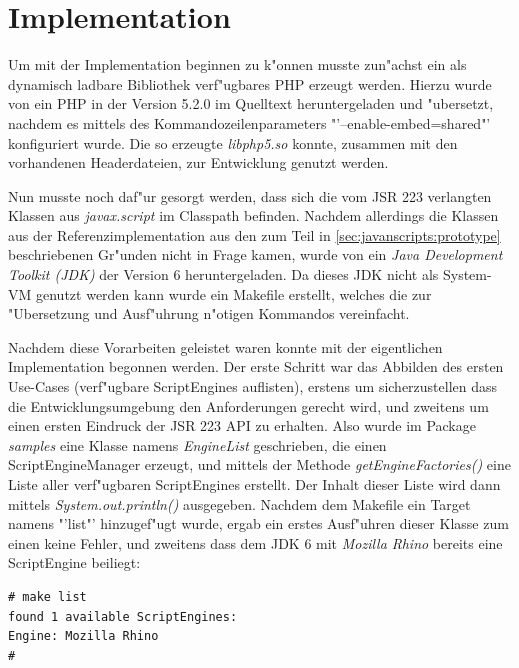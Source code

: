 
\section{Implementation}
\label{sec:chap1:impl}

Um mit der Implementation beginnen zu k"onnen musste zun"achst ein als dynamisch ladbare Bibliothek verf"ugbares
PHP erzeugt werden. Hierzu wurde von \cite{PHPHP} ein PHP in der Version 5.2.0 im Quelltext heruntergeladen und 
"ubersetzt, nachdem es mittels des Kommandozeilenparameters "'--enable-embed=shared"' konfiguriert wurde. Die so
erzeugte \emph{libphp5.so} konnte, zusammen mit den vorhandenen Headerdateien, zur Entwicklung genutzt werden.

Nun musste noch daf"ur gesorgt werden, dass sich die vom JSR 223 verlangten Klassen aus \emph{javax.script} im
Classpath befinden. Nachdem allerdings die Klassen aus der Referenzimplementation aus den zum Teil in 
\ref{sec:javanscripts:prototype} beschriebenen Gr"unden nicht in Frage kamen, wurde von \cite{JAVAHP} ein
\emph{Java Development Toolkit (JDK)} der Version 6 heruntergeladen. Da dieses JDK nicht als System-VM genutzt
werden kann wurde ein Makefile erstellt, welches die zur "Ubersetzung und Ausf"uhrung n"otigen Kommandos
vereinfacht.

Nachdem diese Vorarbeiten geleistet waren konnte mit der eigentlichen Implementation begonnen werden.
Der erste Schritt war das Abbilden des ersten Use-Cases (verf"ugbare ScriptEngines auflisten), erstens um 
sicherzustellen dass die Entwicklungsumgebung den Anforderungen gerecht wird, und zweitens um einen ersten
Eindruck der JSR 223 API zu erhalten. Also wurde im Package \emph{samples} eine Klasse namens
\emph{EngineList} geschrieben, die einen ScriptEngineManager erzeugt, und mittels der Methode
\emph{getEngineFactories()} eine Liste aller verf"ugbaren ScriptEngines erstellt. Der Inhalt dieser
Liste wird dann mittels \emph{System.out.println()} ausgegeben. 
Nachdem dem Makefile ein Target namens "'list"' hinzugef"ugt wurde, ergab ein erstes Ausf"uhren dieser Klasse
zum einen keine Fehler, und zweitens dass dem JDK 6 mit \emph{Mozilla Rhino} bereits eine ScriptEngine beiliegt:
\begin{lstlisting}[caption=erste Tests]
# make list
found 1 available ScriptEngines:
Engine: Mozilla Rhino
#
\end{lstlisting}

